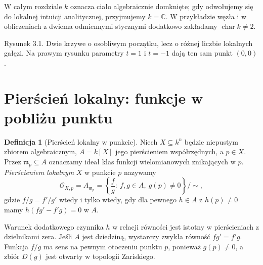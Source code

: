\documentclass[11pt,a4paper,openany]{report}
\numberwithin{equation}{section}
\theoremstyle{plain}
\theoremstyle{definition}
\newtheorem{definicja}[twierdzenie]{Definicja}
\theoremstyle{remark}
\newcommand{\C}{\mathbb C}
\begin{document}
W całym rozdziale $k$ oznacza ciało algebraicznie domknięte;
gdy odwołujemy się do lokalnej intuicji analitycznej,
przyjmujemy $k=\C$. W przykładzie węzła i w obliczeniach
z dwiema odmiennymi stycznymi dodatkowo zakładamy
$\operatorname{char}k\ne2$.

\begin{center}

\small Rysunek 3.1. Dwie krzywe o osobliwym początku, lecz o różnej
liczbie lokalnych gałęzi. Na prawym rysunku parametry $t=1$ i $t=-1$
dają ten sam punkt $(0,0)$.
\end{center}

\section{Pierścień lokalny: funkcje w pobliżu punktu}

\begin{definicja}[Pierścień lokalny w punkcie]
\label{def:local-ring-point}
Niech $X\subseteq k^n$ będzie niepustym zbiorem algebraicznym,
$A=k[X]$ jego pierścieniem współrzędnych, a $p\in X$.
Przez $\mathfrak m_p\subseteq A$ oznaczamy ideał klas
funkcji wielomianowych znikających w $p$.
\emph{Pierścieniem lokalnym} $X$ w punkcie $p$ nazywamy
\[
 \mathcal O_{X,p}=A_{\mathfrak m_p}
 =\left\{\frac fg:\ f,g\in A,\ g(p)\ne0\right\}/\!\sim,
\]
gdzie $f/g=f'/g'$ wtedy i tylko wtedy, gdy dla pewnego
$h\in A$ z $h(p)\ne0$ mamy $h(fg'-f'g)=0$ w $A$.
\end{definicja}

Warunek dodatkowego czynnika $h$ w relacji równości jest
istotny w pierścieniach z dzielnikami zera. Jeśli $A$
jest dziedziną, wystarczy zwykła równość $fg'=f'g$.
Funkcja $f/g$ ma sens na pewnym otoczeniu punktu $p$,
ponieważ $g(p)\ne0$, a zbiór $D(g)$ jest otwarty
w topologii Zariskiego.
\end{document}
